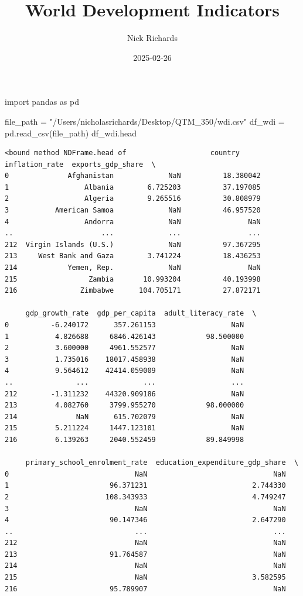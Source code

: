 \documentclass[
  letterpaper,
  DIV=11,
  numbers=noendperiod]{scrartcl}
\title{World Development Indicators}
\author{Nick Richards}
\date{2025-02-26}
\newenvironment{Shaded}{\begin{snugshade}}{\end{snugshade}}
\newcommand{\ImportTok}[1]{\textcolor[rgb]{0.00,0.46,0.62}{#1}}
\newcommand{\NormalTok}[1]{\textcolor[rgb]{0.00,0.23,0.31}{#1}}
\newcommand{\OperatorTok}[1]{\textcolor[rgb]{0.37,0.37,0.37}{#1}}
\newcommand{\StringTok}[1]{\textcolor[rgb]{0.13,0.47,0.30}{#1}}
\begin{document}
\maketitle


\begin{Shaded}
\begin{Highlighting}[]
\ImportTok{import}\NormalTok{ pandas }\ImportTok{as}\NormalTok{ pd}

\NormalTok{file\_path }\OperatorTok{=} \StringTok{"/Users/nicholasrichards/Desktop/QTM\_350/wdi.csv"}
\NormalTok{df\_wdi }\OperatorTok{=}\NormalTok{ pd.read\_csv(file\_path)}
\NormalTok{df\_wdi.head}
\end{Highlighting}
\end{Shaded}

\begin{verbatim}
<bound method NDFrame.head of                    country  inflation_rate  exports_gdp_share  \
0              Afghanistan             NaN          18.380042   
1                  Albania        6.725203          37.197085   
2                  Algeria        9.265516          30.808979   
3           American Samoa             NaN          46.957520   
4                  Andorra             NaN                NaN   
..                     ...             ...                ...   
212  Virgin Islands (U.S.)             NaN          97.367295   
213     West Bank and Gaza        3.741224          18.436253   
214            Yemen, Rep.             NaN                NaN   
215                 Zambia       10.993204          40.193998   
216               Zimbabwe      104.705171          27.872171   

     gdp_growth_rate  gdp_per_capita  adult_literacy_rate  \
0          -6.240172      357.261153                  NaN   
1           4.826688     6846.426143            98.500000   
2           3.600000     4961.552577                  NaN   
3           1.735016    18017.458938                  NaN   
4           9.564612    42414.059009                  NaN   
..               ...             ...                  ...   
212        -1.311232    44320.909186                  NaN   
213         4.082760     3799.955270            98.000000   
214              NaN      615.702079                  NaN   
215         5.211224     1447.123101                  NaN   
216         6.139263     2040.552459            89.849998   

     primary_school_enrolment_rate  education_expenditure_gdp_share  \
0                              NaN                              NaN   
1                        96.371231                         2.744330   
2                       108.343933                         4.749247   
3                              NaN                              NaN   
4                        90.147346                         2.647290   
..                             ...                              ...   
212                            NaN                              NaN   
213                      91.764587                              NaN   
214                            NaN                              NaN   
215                            NaN                         3.582595   
216                      95.789907                              NaN   


\end{verbatim}
\end{document}

